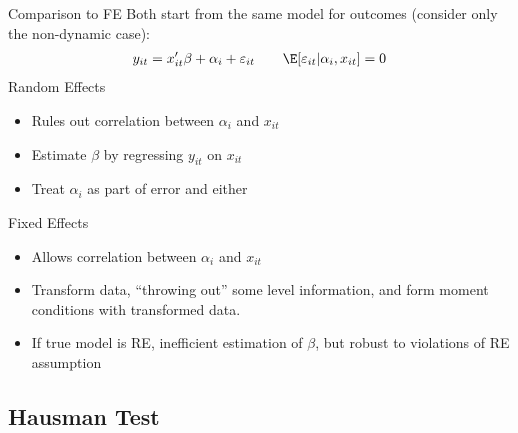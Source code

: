 \documentclass[aspectratio=169, handout]{beamer}
\begin{document}
{\scriptsize
\begin{frame}{Comparison to FE}
Both start from the same model for outcomes (consider only the
non-dynamic case):
\begin{align*}
  y_{it}
  = x_{it}'\beta
  + \alpha_i
  + \varepsilon_{it}
  \qquad
  \E[\varepsilon_{it}|\alpha_i,x_{it}]=0
\end{align*}
\pause
Random Effects
\begin{itemize}
  \item Rules out correlation between $\alpha_i$ and $x_{it}$
  \item Estimate $\beta$ by regressing $y_{it}$ on $x_{it}$
  \item Treat $\alpha_i$ as part of error and either
\end{itemize}
Fixed Effects
\begin{itemize}
  \item Allows correlation between $\alpha_i$ and $x_{it}$
  \pause
  \item Transform data, ``throwing out'' some level information, and
    form moment conditions with transformed data.
  \pause
  \item If true model is RE, inefficient estimation of $\beta$, but
    robust to violations of RE assumption
\end{itemize}
\end{frame}
}








\subsection{Hausman Test}
\end{document}
